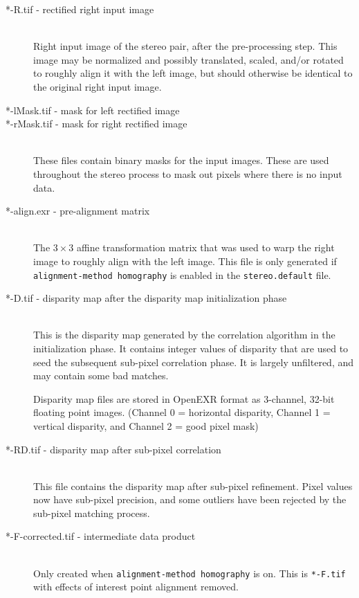 \begin{description}
\item[*-R.tif - \textnormal{rectified right input image}] \hfill \\
  Right input image of the stereo pair, after the pre-processing
  step.  This image may be normalized and possibly
    translated, scaled, and/or rotated to roughly align it with the left
    image, but should otherwise be identical to the original right
  input image.

\item[*-lMask.tif \textnormal{- mask for left rectified image}]
\item[*-rMask.tif \textnormal{- mask for right rectified image}] \hfill \\
  These files contain binary masks for the input images.  These are
  used throughout the stereo process to mask out pixels where there is
  no input data.

\item[*-align.exr \textnormal{- pre-alignment matrix}] \hfill \\
  The $3 \times 3$ affine transformation matrix that was used to warp the right
  image to roughly align with the left image.  This file is only
  generated if \texttt{alignment-method homography} is enabled in the
  {\tt stereo.default} file.

\item[*-D.tif \textnormal{- disparity map after the disparity map initialization phase}] \hfill \\
  This is the disparity map generated by the correlation algorithm in
  the initialization phase.  It contains integer values of disparity
  that are used to seed the subsequent sub-pixel correlation phase.
  It is largely unfiltered, and may contain some bad matches.

  Disparity map files are stored in OpenEXR format as 3-channel,
  32-bit floating point images.  (Channel 0 = horizontal disparity,
  Channel 1 = vertical disparity, and Channel 2 = good pixel mask)

\item[*-RD.tif - \textnormal{disparity map after sub-pixel correlation}] \hfill \\
  This file contains the disparity map after sub-pixel refinement.
  Pixel values now have sub-pixel precision, and some outliers have
  been rejected by the sub-pixel matching process.

\item[*-F-corrected.tif \textnormal{- intermediate data product}] \hfill \\
  Only created when \texttt{alignment-method homography} is on.
  This is \texttt{*-F.tif} with effects of interest point alignment removed.


\end{description}
